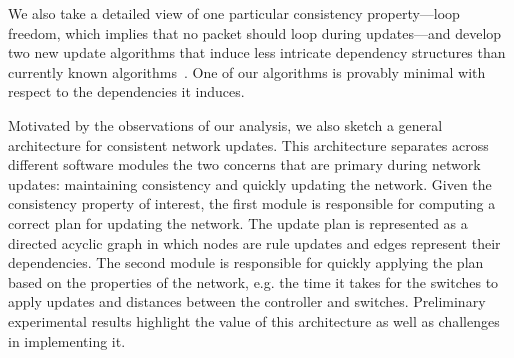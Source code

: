 We also take a detailed view of one particular consistency property---loop freedom, which implies that  no packet should loop during updates---and develop two new update algorithms that induce less intricate dependency structures than currently known algorithms~\cite{safeupdate}. One of our algorithms is provably minimal with respect to the dependencies it induces.

Motivated by the observations of our analysis, we also sketch a general architecture for consistent network updates. This architecture separates across different software modules the two concerns that are primary during network updates: maintaining  consistency and quickly updating the network. Given the consistency property of interest, the first module is responsible for computing a correct plan for updating the network. The update plan is represented as a directed acyclic graph in which nodes are rule updates and edges represent their dependencies.  The second module is responsible for quickly applying the plan based on the properties of the network, e.g. the time it takes for the switches to apply updates and distances between the controller and switches. Preliminary experimental results highlight the value of this architecture as well as challenges in implementing it.
